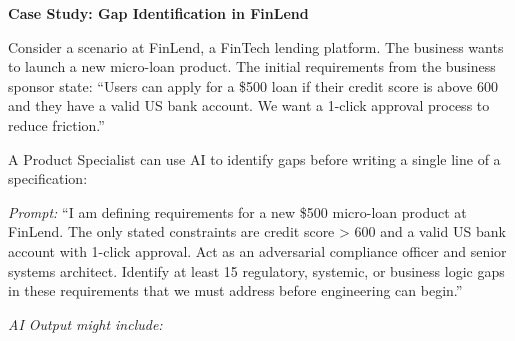 \documentclass[
  11pt,
  openany,
  oneside]{book}
\begin{document}
\textbf{Case Study: Gap Identification in FinLend}

Consider a scenario at FinLend, a FinTech lending platform. The business
wants to launch a new micro-loan product. The initial requirements from
the business sponsor state: ``Users can apply for a \$500 loan if their
credit score is above 600 and they have a valid US bank account. We want
a 1-click approval process to reduce friction.''

A Product Specialist can use AI to identify gaps before writing a single
line of a specification:

\emph{Prompt:} ``I am defining requirements for a new \$500 micro-loan
product at FinLend. The only stated constraints are credit score
\textgreater{} 600 and a valid US bank account with 1-click approval.
Act as an adversarial compliance officer and senior systems architect.
Identify at least 15 regulatory, systemic, or business logic gaps in
these requirements that we must address before engineering can begin.''

\emph{AI Output might include:}
\end{document}
